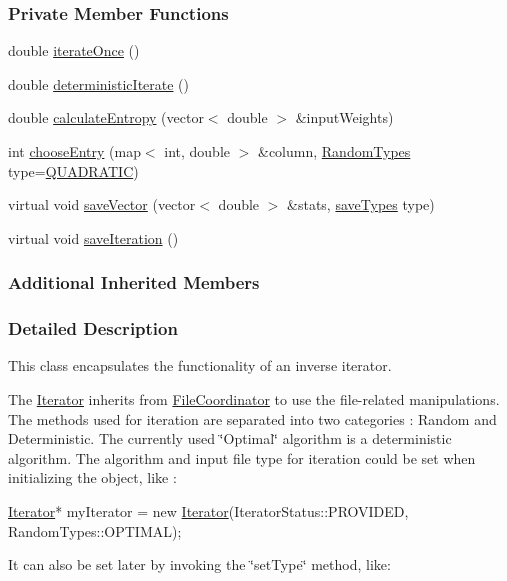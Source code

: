 \subsubsection*{Private Member Functions}
\begin{DoxyCompactItemize}
\item 
double \hyperlink{class_iterator_ac6937ada533622f876cabb537a1718c3}{iterate\+Once} ()
\item 
double \hyperlink{class_iterator_a2f3034192d0795b138b623a9101be1d0}{deterministic\+Iterate} ()
\item 
double \hyperlink{class_iterator_a1706477265276cdc503b99be64e63c12}{calculate\+Entropy} (vector$<$ double $>$ \&input\+Weights)
\item 
int \hyperlink{class_iterator_a94446a4d14889f3e9f354775916fd9b9}{choose\+Entry} (map$<$ int, double $>$ \&column, \hyperlink{class_iterator_a68bc1c5e7ad39ed78690beaa8a607430}{Random\+Types} type=\hyperlink{class_iterator_a68bc1c5e7ad39ed78690beaa8a607430a1376e2aba7a2d8ff9240ed369a5bc08b}{Q\+U\+A\+D\+R\+A\+T\+I\+C})
\item 
virtual void \hyperlink{class_iterator_a17d24545df8bc3245ef4d31928a85186}{save\+Vector} (vector$<$ double $>$ \&stats, \hyperlink{class_file_coordinator_a3675d464de774750ec143958d199891e}{save\+Types} type)
\item 
virtual void \hyperlink{class_iterator_a2bd1f005ae0c283af59e9b5698934d88}{save\+Iteration} ()
\end{DoxyCompactItemize}
\subsubsection*{Additional Inherited Members}


\subsubsection{Detailed Description}
This class encapsulates the functionality of an inverse iterator. 

The \hyperlink{class_iterator}{Iterator} inherits from \hyperlink{class_file_coordinator}{File\+Coordinator} to use the file-\/related manipulations. The methods used for iteration are separated into two categories \+: Random and Deterministic. The currently used \char`\"{}\+Optimal\char`\"{} algorithm is a deterministic algorithm. The algorithm and input file type for iteration could be set when initializing the object, like \+:


\begin{DoxyCode}
\hyperlink{class_iterator}{Iterator}* myIterator = \textcolor{keyword}{new} \hyperlink{class_iterator_ab920b49c3035b9ca62557f9c211a9a12}{Iterator}(IteratorStatus::PROVIDED, RandomTypes::OPTIMAL);
\end{DoxyCode}
 It can also be set later by invoking the \char`\"{}set\+Type\char`\"{} method, like\+:


